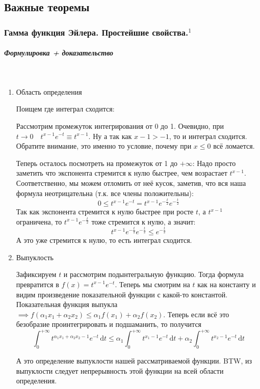 \documentclass{article}
\def\D{\,\mathrm{d}}
\let\vanillasubparagraph\subparagraph
\renewcommand{\subparagraph}[1]{\vanillasubparagraph{#1}\mbox{}\\}
\begin{document}
\newpage
\subsection{Важные теоремы}
\subsubsection{Гамма функция Эйлера. Простейшие свойства.\texorpdfstring{$^1$}{}}
\subparagraph{Формулировка + доказательство}
\begin{enumerate}
    \item Область определения
    
    Поищем где интеграл сходится:
    
    Рассмотрим промежуток интегрирования от 0 до 1. Очевидно, при $t\rightarrow 0 \quad t^{x-1} e^{-t} \equiv t^{x-1}$. Ну а так как $x-1 > -1$, то и интеграл сходится. Обратите внимание, это именно то условие, почему при $x \le 0$ всё ломается.
    
    Теперь осталось посмотреть на промежуток от 1 до $+\infty$:
    Надо просто заметить что экспонента стремится к нулю быстрее, чем возрастает $t^{x-1}$. Соответственно, мы можем отломить от неё кусок, заметив, что вся наша формула неотрицательна (т.к. все члены положительны):
    $$
    0 \le t^{x-1} e^{-t} = t^{x-1} e^{-\frac t2} e^{-\frac t2}
    $$
    Так как экспонента стремится к нулю быстрее при росте $t$, а $t^{x-1}$ ограничена, то $t^{x-1} e^{-\frac t2}$ тоже стремится к нулю, а значит:
    $$
    t^{x-1} e^{-\frac t2} e^{-\frac t2} \le e^{-\frac t2}
    $$
    А это уже стремится к нулю, то есть интеграл сходится.
    
    
    \item Выпуклость
    
    Зафиксируем $t$ и рассмотрим подынтегральную функцию. Тогда формула превратится в $f(x) = t^{x-1}e^{-t}$. Теперь мы смотрим на $t$ как на константу и видим произведение показательной функции с какой-то константой. Показательная функция выпукла $\implies f(\alpha_1 x_1 + \alpha_2 x_2) \le \alpha_1 f(x_1) + \alpha_2 f(x_2)$. Теперь если всё это безобразие проинтегрировать и подшаманить, то получится $$
    \int^{+\infty}_0 t^{\alpha_1 x_1 + \alpha_2 x_2 -1} e^{-t} \D t \le \alpha_1 \int^{+\infty}_0 t^{x_1-1} e^{-t} \D t + \alpha_2 \int^{+\infty}_0 t^{x_2-1} e^{-t} \D t
    $$
    
    А это определение выпуклости нашей рассматриваемой функции. BTW, из выпуклости следует непрерывность этой функции на всей области определения.
    

\end{enumerate}
\end{document}
